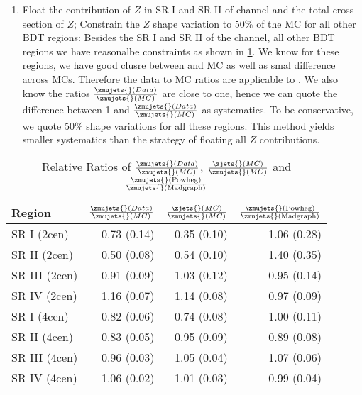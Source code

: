 \begin{enumerate}
\item \label{item:z-treat-5} Float the contribution of $Z$ in SR I and SR II of \twocentral channel and the total cross section of $Z$; Constrain the $Z$ shape variation to 50\% of the \zjets{} MC for all other BDT regions: Besides the SR I and SR II of the \twocentral channel, all other BDT regions we have reasonalbe constraints as shown in \ref{tab:z_ratios}. We know for these regions, we have good clusre between \zjets{} and \zmujets{} MC as well as smal difference across \zmujets{} MCs. Therefore the \zmujets{} data to MC ratios are applicable to \zjets{}. We also know the ratios $\frac{\zmujets{}(Data)}{\zmujets{}(MC)}$ are close to one, hence we can quote the difference between 1 and $\frac{\zmujets{}(Data)}{\zmujets{}(MC)}$ as systematics. To be conservative, we quote 50\% shape variations for all these regions. This method yields smaller systematics than the strategy of floating all $Z$ contributions. 

\end{enumerate}



\begin{table}[]
\centering
\caption{Relative Ratios of $\frac{\zmujets{}(Data)}{\zmujets{}(MC)}$, 
$\frac{\zjets{}(MC)}{\zmujets{}(MC)}$ 
and $\frac{\zmujets{}(\textnormal{Powheg})}{\zmujets{}(\textnormal{Madgraph})}$}
\label{tab:z_ratios}
\begin{tabular}{|l|r|r|r|}
\hline
Region       &  $\frac{\zmujets{}(Data)}{\zmujets{}(MC)}$ & $\frac{\zjets{}(MC)}{\zmujets{}(MC)}$ & $\frac{\zmujets{}(\textnormal{Powheg})}{\zmujets{}(\textnormal{Madgraph})}$  \\ \hline
SR I   (2cen)  & 0.73 (0.14) & 0.35 (0.10) & 1.06 (0.28)\\ \hline
SR II  (2cen)  & 0.50 (0.08) & 0.54 (0.10) & 1.40 (0.35)\\ \hline
SR III (2cen)  & 0.91 (0.09) & 1.03 (0.12) & 0.95 (0.14)\\ \hline
SR IV  (2cen)  & 1.16 (0.07) & 1.14 (0.08) & 0.97 (0.09)\\ \hline
SR I   (4cen)  & 0.82 (0.06) & 0.74 (0.08) & 1.00 (0.11)\\ \hline
SR II  (4cen)  & 0.83 (0.05) & 0.95 (0.09) & 0.89 (0.08)\\ \hline
SR III (4cen)  & 0.96 (0.03) & 1.05 (0.04) & 1.07 (0.06)\\ \hline
SR IV  (4cen)  & 1.06 (0.02) & 1.01 (0.03) & 0.99 (0.04)\\ \hline

\end{tabular}
\end{table}



